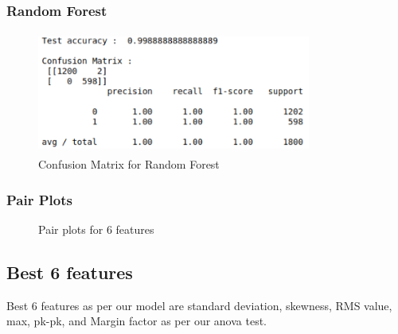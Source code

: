 \subsubsection{Random Forest}

\begin{figure}[H]
  \includegraphics[height = 4cm,width= 9cm]{images/3_feat_rand}
  \caption{Confusion Matrix for Random Forest}
\end{figure}

\subsubsection{Pair Plots}

\begin{figure}[H]
  \noindent{}
\caption{Pair plots for 6 features}
\end{figure}


\subsection{Best 6 features}
Best 6 features as per our model are standard deviation, skewness, RMS value, max, pk-pk, and Margin factor as per our anova test.

